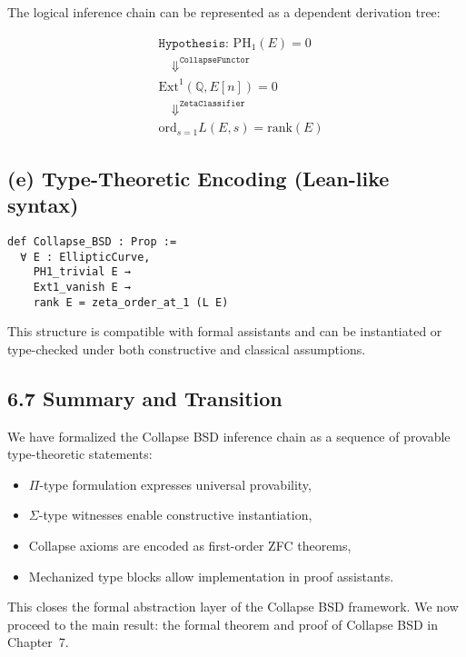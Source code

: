 \documentclass[11pt]{article}
\begin{document}
The logical inference chain can be represented as a dependent derivation tree:

\[
\begin{aligned}
& \texttt{Hypothesis: } \mathrm{PH}_1(E) = 0 \\
& \quad \Downarrow^{\texttt{CollapseFunctor}} \\
& \mathrm{Ext}^1(\mathbb{Q}, E[n]) = 0 \\
& \quad \Downarrow^{\texttt{ZetaClassifier}} \\
& \mathrm{ord}_{s=1} L(E,s) = \mathrm{rank}(E)
\end{aligned}
\]

\subsection*{(e) Type-Theoretic Encoding (Lean-like syntax)}
\vspace{0.5em}
\begin{verbatim}
def Collapse_BSD : Prop :=
  ∀ E : EllipticCurve,
    PH1_trivial E →
    Ext1_vanish E →
    rank E = zeta_order_at_1 (L E)
\end{verbatim}


This structure is compatible with formal assistants and can be instantiated or type-checked under both constructive and classical assumptions.

\subsection{6.7 Summary and Transition}

We have formalized the Collapse BSD inference chain as a sequence of provable type-theoretic statements:
\begin{itemize}
  \item $\Pi$-type formulation expresses universal provability,
  \item $\Sigma$-type witnesses enable constructive instantiation,
  \item Collapse axioms are encoded as first-order ZFC theorems,
  \item Mechanized type blocks allow implementation in proof assistants.
\end{itemize}

This closes the formal abstraction layer of the Collapse BSD framework.  
We now proceed to the main result: the formal theorem and proof of Collapse BSD in Chapter~7.



\end{document}

